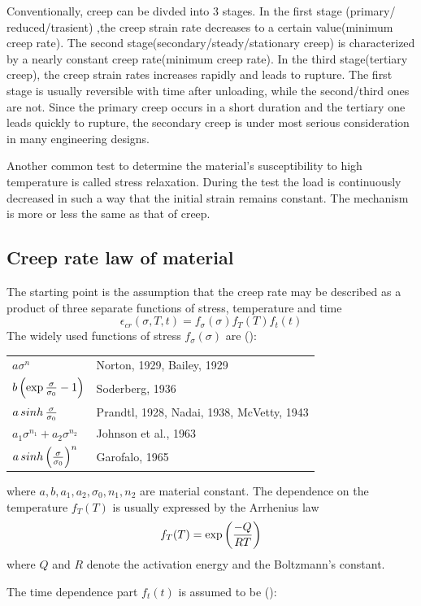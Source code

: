 \documentclass[10pt]{article}
\begin{document}
Conventionally, creep can be divded into $3$ stages. In the first stage (primary/ reduced/trasient) ,the creep strain rate decreases to a certain value(minimum creep rate). The second stage(secondary/steady/stationary creep) is characterized by a nearly constant creep rate(minimum creep rate). In the third stage(tertiary creep), the creep strain rates increases rapidly and leads to rupture. The first stage is usually reversible with time after unloading, while the second/third ones are not. Since the primary creep occurs in a short duration and the tertiary one leads quickly to rupture, the secondary creep is under most serious consideration in many engineering designs.

Another common test to determine the material's susceptibility to high temperature is called stress relaxation. During the test the load is continuously decreased in such a way that the initial strain remains constant. The mechanism is more or less the same as that of creep.

\subsection{Creep rate law of material}
\label{sec:Creep}
The starting point is the assumption that the creep rate may be described as a product of three separate functions of stress, temperature and time
\[
\epsilon_{cr}(\sigma,T,t)=f_\sigma (\sigma) f_T(T) f_t(t)
\]
The widely used functions of stress $f_\sigma(\sigma)$ are (\cite{NaKo2006}):

\begin{tabular}{ll}
$a\sigma^n$ & Norton, 1929, Bailey, 1929 \\
$b\left( \exp{\sigma\over \sigma_0} -1 \right)$ & Soderberg, 1936 \\
$a\mathop{sinh}{\sigma\over \sigma_0}$ & Prandtl, 1928, Nadai, 1938, McVetty, 1943\\
$a_1\sigma^{n_1} + a_2 \sigma^{n_2}$ & Johnson et al., 1963 \\
$a\mathop{sinh} \left( {\sigma\over \sigma_0}\right)^n$ & Garofalo, 1965
\end{tabular}

where $a,b,a_1,a_2,\sigma_0,n_1,n_2$ are material constant. The dependence on the temperature $f_T(T)$ is usually expressed by the Arrhenius law
\[
f_T(T) = \exp \left( {-Q\over RT}\right)
\]
where $Q$ and $R$ denote the activation energy and the Boltzmann's constant.

The time dependence part $f_t(t)$ is assumed to be (\cite{Ch2000}):
\end{document}
